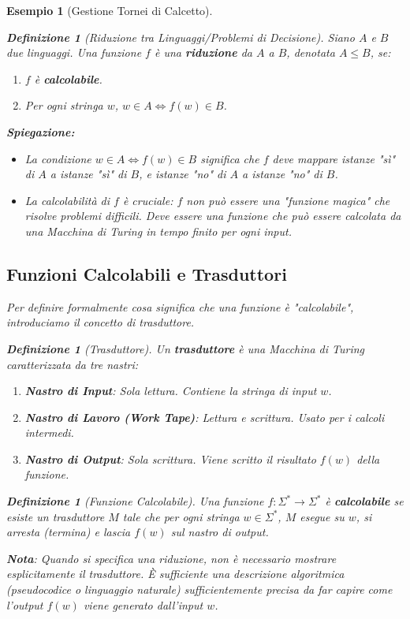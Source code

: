 \documentclass[a4paper]{article}
\newtheorem{definition}[theorem]{Definizione}
\newtheorem{example}[theorem]{Esempio}
\begin{document}
\begin{example}[Gestione Tornei di Calcetto]
\begin{definition}[Riduzione tra Linguaggi/Problemi di Decisione]
Siano $A$ e $B$ due linguaggi. Una funzione $f$ è una \textbf{riduzione} da $A$ a $B$, denotata $A \le B$, se:
\begin{enumerate}
    \item $f$ è \textbf{calcolabile}.
    \item Per ogni stringa $w$, $w \in A \iff f(w) \in B$.
\end{enumerate}
\end{definition}

\textbf{Spiegazione:}
\begin{itemize}
    \item La condizione $w \in A \iff f(w) \in B$ significa che $f$ deve mappare istanze "sì" di $A$ a istanze "sì" di $B$, e istanze "no" di $A$ a istanze "no" di $B$.
    \item La calcolabilità di $f$ è cruciale: $f$ non può essere una "funzione magica" che risolve problemi difficili. Deve essere una funzione che può essere calcolata da una Macchina di Turing in tempo finito per ogni input.
\end{itemize}

\subsection{Funzioni Calcolabili e Trasduttori}

Per definire formalmente cosa significa che una funzione è "calcolabile", introduciamo il concetto di trasduttore.

\begin{definition}[Trasduttore]
Un \textbf{trasduttore} è una Macchina di Turing caratterizzata da tre nastri:
\begin{enumerate}
    \item \textbf{Nastro di Input}: Sola lettura. Contiene la stringa di input $w$.
    \item \textbf{Nastro di Lavoro (Work Tape)}: Lettura e scrittura. Usato per i calcoli intermedi.
    \item \textbf{Nastro di Output}: Sola scrittura. Viene scritto il risultato $f(w)$ della funzione.
\end{enumerate}
\end{definition}

\begin{definition}[Funzione Calcolabile]
Una funzione $f: \Sigma^* \to \Sigma^*$ è \textbf{calcolabile} se esiste un trasduttore $M$ tale che per ogni stringa $w \in \Sigma^*$, $M$ esegue su $w$, si arresta (termina) e lascia $f(w)$ sul nastro di output.
\end{definition}
\textbf{Nota}: Quando si specifica una riduzione, non è necessario mostrare esplicitamente il trasduttore. È sufficiente una descrizione algoritmica (pseudocodice o linguaggio naturale) sufficientemente precisa da far capire come l'output $f(w)$ viene generato dall'input $w$.


\end{example}
\end{document}
